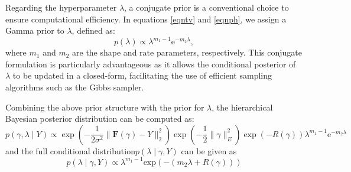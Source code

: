 \documentclass{ws-mplb}
\begin{document}
Regarding the hyperparameter $\lambda$, a conjugate prior is a conventional choice to ensure computational efficiency. In equations \eqref{eqntv} and \eqref{eqnph}, we assign a Gamma prior to $\lambda$, defined as:
\[p(\lambda) \propto \lambda^{m_1 - 1} \mathrm{e}^{-m_2 \lambda}, \] where $m_1$ and $m_2$ are the shape and rate parameters, respectively. This conjugate formulation is particularly advantageous as it allows the conditional posterior of $\lambda$ to be updated in a closed-form, facilitating the use of efficient sampling algorithms such as the Gibbs sampler.


%

%

%

Combining the above prior structure with the prior for $\lambda$, the hierarchical Bayesian posterior distribution can be computed as:
\[
p(\gamma, \lambda \mid Y) \propto \exp\left(-\frac{1}{2\sigma^2}\|\mathbf{F}(\gamma) - Y\|_2^2\right) \exp\left(-\frac{1}{2}\|\gamma\|_E^2\right)\exp\left(- R(\gamma)\right) \lambda^{m_1 - 1} \mathrm{e}^{-m_2 \lambda}
\]
and the full conditional distribution$p(\lambda \mid \gamma,Y)$ can be given as
\[
p(\lambda \mid \gamma,Y) \propto \lambda^{m_1 - 1}   \mathrm{exp}(-(m_2 \lambda+R(\gamma)))
\]
\end{document}
